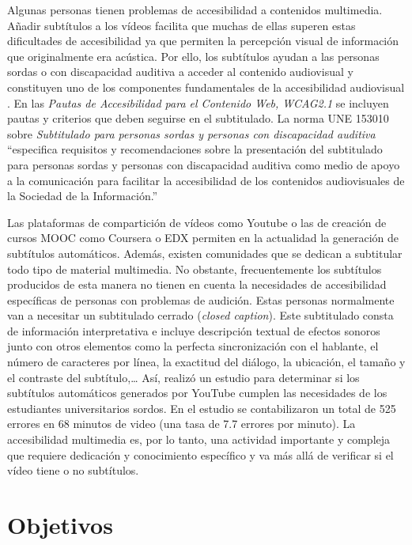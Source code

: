 \documentclass[
  12pt,
  a4paper,
  extrafontsizes,
  onecolumn,
  openright,
  table]{memoir}
\newlength{\rf}
\begin{document}
Algunas personas tienen problemas de accesibilidad a contenidos
multimedia. Añadir subtítulos a los vídeos facilita que muchas de ellas
superen estas dificultades de accesibilidad ya que permiten la
percepción visual de información que originalmente era acústica. Por
ello, los subtítulos ayudan a las personas sordas o con discapacidad
auditiva a acceder al contenido audiovisual y constituyen uno de los
componentes fundamentales de la accesibilidad audiovisual
\autocite[ver][]{jperez1}. En las \emph{Pautas de Accesibilidad para el
Contenido Web, WCAG2.1} \autocite[ver][]{WCAG21} se incluyen pautas y
criterios que deben seguirse en el subtitulado. La norma UNE 153010
\autocite[ver][]{aenor2012} sobre \emph{Subtitulado para personas sordas
y personas con discapacidad auditiva} \enquote{especifica requisitos y
recomendaciones sobre la presentación del subtitulado para personas
sordas y personas con discapacidad auditiva como medio de apoyo a la
comunicación para facilitar la accesibilidad de los contenidos
audiovisuales de la Sociedad de la Información.}

Las plataformas de compartición de vídeos como Youtube o las de creación
de cursos MOOC como Coursera o EDX permiten en la actualidad la
generación de subtítulos automáticos. Además, existen comunidades que se
dedican a subtitular todo tipo de material multimedia. No obstante,
frecuentemente los subtítulos producidos de esta manera no tienen en
cuenta la necesidades de accesibilidad específicas de personas con
problemas de audición. Estas personas normalmente van a necesitar un
subtitulado cerrado (\emph{closed caption}). Este subtitulado consta de
información interpretativa e incluye descripción textual de efectos
sonoros junto con otros elementos como la perfecta sincronización con el
hablante, el número de caracteres por línea, la exactitud del diálogo,
la ubicación, el tamaño y el contraste del subtítulo,\ldots{} Así,
\textcite{parton2016} realizó un estudio para determinar si los
subtítulos automáticos generados por YouTube cumplen las necesidades de
los estudiantes universitarios sordos. En el estudio se contabilizaron
un total de 525 errores en 68 minutos de video (una tasa de 7.7 errores
por minuto). La accesibilidad multimedia es, por lo tanto, una actividad
importante y compleja que requiere dedicación y conocimiento específico
y va más allá de verificar si el vídeo tiene o no subtítulos.

\hypertarget{objetivos}{%
\section{Objetivos}\label{objetivos}}
\end{document}
